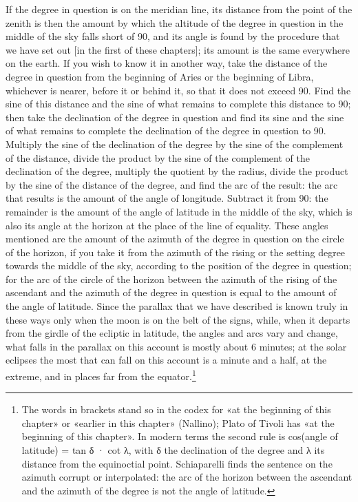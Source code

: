 \documentclass[11pt]{article}
\newcommand{\ArPage}[1]{\marginpar{\footnotesize\color{gray}Ar.\,p.\,#1}}
\begin{document}
\par \ArPage{123}If the degree in question is on the meridian line, its distance from the point of the zenith is then the amount by which the altitude of the degree in question in the middle of the sky falls short of 90, and its angle is found by the procedure that we have set out [in the first of these chapters]; its amount is the same everywhere on the earth. If you wish to know it in another way, take the distance of the degree in question from the beginning of Aries or the beginning of Libra, whichever is nearer, before it or behind it, so that it does not exceed 90. Find the sine of this distance and the sine of what remains to complete this distance to 90; then take the declination of the degree in question and find its sine and the sine of what remains to complete the declination of the degree in question to 90. Multiply the sine of the declination of the degree by the sine of the complement of the distance, divide the product by the sine of the complement of the declination of the degree, multiply the quotient by the radius, divide the product by the sine of the distance of the degree, and find the arc of the result: the arc that results is the amount of the angle of longitude. Subtract it from 90: the remainder is the amount of the angle of latitude in the middle of the sky, which is also its angle at the horizon at the place of the line of equality. These angles mentioned are the amount of the azimuth of the degree in question on the circle of the horizon, if you take it from the azimuth of the rising or the setting degree towards the middle of the sky, according to the position of the degree in question; for the arc of the circle of the horizon between the azimuth of the rising of the ascendant and the azimuth of the degree in question is equal to the amount of the angle of latitude. Since the parallax that we have described is known truly in these ways only when the moon is on the belt of the signs, while, when it departs from the girdle of the ecliptic in latitude, the angles and arcs vary and change, what falls in the parallax on this account is mostly about 6 minutes; at the solar eclipses the most that can fall on this account is a minute and a half, at the extreme, and in places far from the equator.\footnote{The words in brackets stand so in the codex for «at the beginning of this chapter» or «earlier in this chapter» (Nallino); Plato of Tivoli has «at the beginning of this chapter». In modern terms the second rule is cos(angle of latitude) = tan δ · cot λ, with δ the declination of the degree and λ its distance from the equinoctial point. Schiaparelli finds the sentence on the azimuth corrupt or interpolated: the arc of the horizon between the ascendant and the azimuth of the degree is not the angle of latitude.}\par
\end{document}
